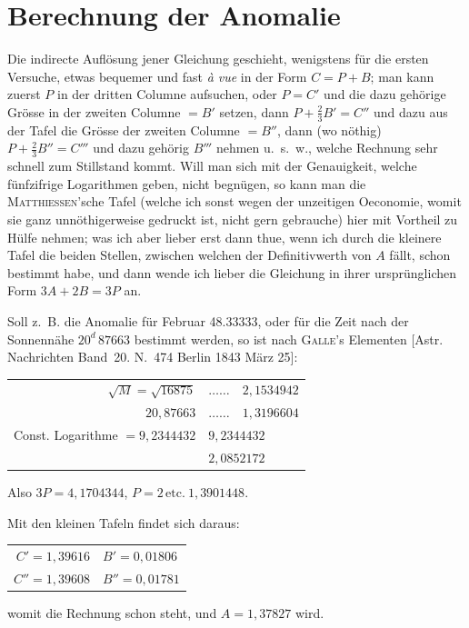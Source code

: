 \documentclass[11pt,a4paper]{book}
\begin{document}
\section*{Berechnung der Anomalie}

Die indirecte Auflösung jener Gleichung geschieht, wenigstens für die ersten Versuche, etwas bequemer und fast \textit{à vue} in der Form $C = P + B$; man kann zuerst $P$ in der dritten Columne aufsuchen, oder $P = C'$ und die dazu gehörige Grösse in der zweiten Columne $= B'$ setzen, dann $P + \frac{2}{3}B' = C''$ und dazu aus der Tafel die Grösse der zweiten Columne $= B''$, dann (wo nöthig) $P + \frac{2}{3}B'' = C'''$ und dazu gehörig $B'''$ nehmen u.~s.~w., welche Rechnung sehr schnell zum Stillstand kommt. Will man sich mit der Genauigkeit, welche fünfzifrige Logarithmen geben, nicht begnügen, so kann man die \textsc{Matthiessen}'sche Tafel (welche ich sonst wegen der unzeitigen Oeconomie, womit sie ganz unnöthigerweise gedruckt ist, nicht gern gebrauche) hier mit Vortheil zu Hülfe nehmen; was ich aber lieber erst dann thue, wenn ich durch die kleinere Tafel die beiden Stellen, zwischen welchen der Definitivwerth von $A$ fällt, schon bestimmt habe, und dann wende ich lieber die Gleichung in ihrer ursprünglichen Form $3A + 2B = 3P$ an.

Soll z.~B. die Anomalie für Februar 48.33333, oder für die Zeit nach der Sonnennähe $20^{d}\,87663$ bestimmt werden, so ist nach \textsc{Galle}'s Elementen [Astr. Nachrichten Band~20. N.~474 Berlin 1843 März 25]:

\begin{center}
\begin{tabular}{r@{\quad}l}
$\sqrt{M} = \sqrt{16875}$ & $\ldots\ldots\quad 2{,}1534942$ \\
$20{,}87663$ & $\ldots\ldots\quad 1{,}3196604$ \\
\hline
Const. Logarithme $= 9{,}2344432$ & $9{,}2344432$ \\
\hline
& $2{,}0852172$
\end{tabular}
\end{center}

Also $3P = 4{,}1704344$, $P = 2\, \text{etc.}\ 1{,}3901448$.

Mit den kleinen Tafeln findet sich daraus:
\begin{center}
\begin{tabular}{r@{\quad}l}
$C' = 1{,}39616$ & $B' = 0{,}01806$ \\
$C'' = 1{,}39608$ & $B'' = 0{,}01781$
\end{tabular}
\end{center}
womit die Rechnung schon steht, und $A = 1{,}37827$ wird.
\end{document}
